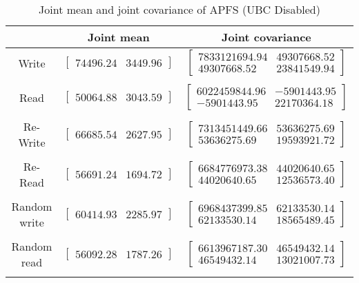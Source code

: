 
	\begin{table}
	\caption{Joint mean and joint covariance of APFS (UBC Disabled)}
	\begin{tabular}{| c | c | c |}
	\hline
	{} & \textbf{Joint mean} & \textbf{Joint covariance}\\
	\hline
	\hline
Write & $\left[ \begin{array}{rr} 74496.24 & 3449.96 \end{array}\right] $ & $\left[ \begin{array}{rr} 7833121694.94 & 49307668.52 \\ 49307668.52 & 23841549.94 \end{array}\right] $\\ 
{} & {} & {} \\ 
Read & $\left[ \begin{array}{rr} 50064.88 & 3043.59 \end{array}\right] $ & $\left[ \begin{array}{rr} 6022459844.96 & -5901443.95 \\ -5901443.95 & 22170364.18 \end{array}\right] $\\ 
{} & {} & {} \\ 
Re-Write & $\left[ \begin{array}{rr} 66685.54 & 2627.95 \end{array}\right] $ & $\left[ \begin{array}{rr} 7313451449.66 & 53636275.69 \\ 53636275.69 & 19593921.72 \end{array}\right] $\\ 
{} & {} & {} \\ 
Re-Read & $\left[ \begin{array}{rr} 56691.24 & 1694.72 \end{array}\right] $ & $\left[ \begin{array}{rr} 6684776973.38 & 44020640.65 \\ 44020640.65 & 12536573.40 \end{array}\right] $\\ 
{} & {} & {} \\ 
Random write & $\left[ \begin{array}{rr} 60414.93 & 2285.97 \end{array}\right] $ & $\left[ \begin{array}{rr} 6968437399.85 & 62133530.14 \\ 62133530.14 & 18565489.45 \end{array}\right] $\\ 
{} & {} & {} \\ 
Random read & $\left[ \begin{array}{rr} 56092.28 & 1787.26 \end{array}\right] $ & $\left[ \begin{array}{rr} 6613967187.30 & 46549432.14 \\ 46549432.14 & 13021007.73 \end{array}\right] $\\ 
{} & {} & {} \\ 

	\hline
	\end{tabular}
	\label{tbl:stat-apfs_ubc_disabled}
	\end{table}
